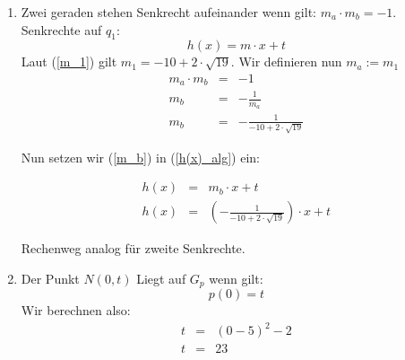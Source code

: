\documentclass{scrartcl}
\begin{document}
\begin{enumerate}
\begin{enumerate}
				
				
				
				
				
			\item Zwei geraden stehen Senkrecht aufeinander wenn gilt: $m_a \cdot m_b = -1$.\\

				Senkrechte auf $q_1$: 
				\begin{equation}
					h(x) = m \cdot x + t \label{h(x)_alg}
				\end{equation}
				Laut (\ref{m_1}) gilt $m_1 = -10 + 2 \cdot \sqrt{19}$. Wir definieren nun  $m_a := m_1$
				\begin{eqnarray}
					m_a \cdot m_b &=& -1 \\
					m_b &=& - \frac{1}{m_a} \\
					m_b &=& - \frac{1}{-10 + 2 \cdot \sqrt{19}} \label{m_b}
				\end{eqnarray}
				
				Nun setzen wir (\ref{m_b}) in (\ref{h(x)_alg}) ein:
				
				\begin{eqnarray}
					h(x) &=& m_b \cdot x + t \\
					h(x) &=& \left (- \frac{1}{-10 + 2 \cdot \sqrt{19}} \right ) \cdot x + t 
				\end{eqnarray}
				
				Rechenweg analog für zweite Senkrechte.
				
			\item Der Punkt $N(0,t)$ Liegt auf $G_p$ wenn gilt: \label{Schnittpunkt_h_p}
				\begin{equation}
					p(0) = t
				\end{equation}
				Wir berechnen also:
				\begin{eqnarray}
					t &=& (0-5)^2-2 \\
					t &=& 23
				\end{eqnarray}
			
		\end{enumerate} %
		
		
		
	\end{enumerate} 
	
	
	
	
	
	
	
	
	
	
	
	
	
	
	
	
	
	
	
	
	
	
	
	
	
	
	
	
	
	
	
	
	
	
	
	
	
	
	
	
	
	
\end{document}

